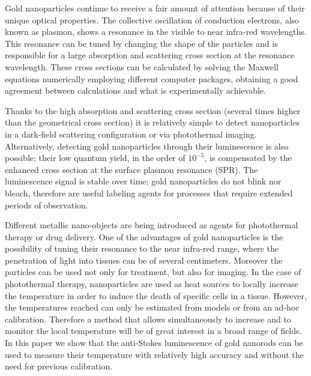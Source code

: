 \documentclass[journal=nalefd,manuscript=letter]{achemso}
\begin{document}
Gold nanoparticles continue to receive a fair amount of attention because of
their unique optical properties\cite{Zijlstra2011}. The collective oscillation
of conduction electrons, also known as plasmon, shows a resonance in the visible to
near infra-red wavelengths. This resonance can be tuned by changing the shape of
the particles\cite{Carattino2016} and is responsible for a large absorption
and scattering cross section at the resonance wavelength. These cross sections can
be calculated by solving the Maxwell equations numerically employing different computer
packages\cite{Draine1994,Yurkin2011,Oskooi2010}, obtaining a good agreement
between calculations and what is experimentally achievable. 

Thanks to the high absorption and scattering cross section (several times higher
than the geometrical cross section) it is relatively simple to detect
nanoparticles in a dark-field scattering configuration\cite{Hu2008} or via
photothermal imaging\cite{boyer2002photothermal, Berciaud2006}.
Alternatively, detecting gold nanoparticles through their
luminescence\cite{Tcherniak2011} is also possible; their low quantum
yield\cite{Fang2012,Rao2015,Yorulmaz2012,Cheng2015}, in the order of $10^{-5}$,
is compensated by the enhanced cross section at the surface plasmon resonance
(SPR). The luminescence signal is stable over time; gold nanoparticles do not
blink nor bleach, therefore are useful labeling agents for processes that
require extended periods of observation\cite{Wang2005}.

Different metallic nano-objects are being introduced as agents for photothermal
therapy\cite{Huang2006,Huang2008} or drug delivery\cite{Kang2013}. One of the
advantages of gold nanoparticles is the possibility of tuning their resonance to
the near infra-red range, where the penetration of light into tissues can be of
several
centimeters\cite{Huang2006,Gobin2007,Hirsch2003,ONeal2004,Li2013c,Huang2008}.
Moreover the particles can be used not only for treatment, but also for
imaging\cite{Zhao2014a,Huang2006}. In the case of photothermal therapy,
nanoparticles are used as heat sources\cite{Gobin2007,Hirsch2003} to locally
increase the temperature in order to induce the death of specific cells in a
tissue\cite{Huang2008,Huang2006}. However, the temperatures
reached\cite{Donner2013} can only be estimated from models\cite{Zhao2014a} or
from an ad-hoc calibration. Therefore a method that allows simultaneously to
increase and to monitor the local temperature will be of great interest in a
broad range of fields. In this paper we show that the anti-Stokes luminescence
of gold nanorods can be used to measure their temperature with relatively high
accuracy and without the need for previous calibration.
\end{document}

